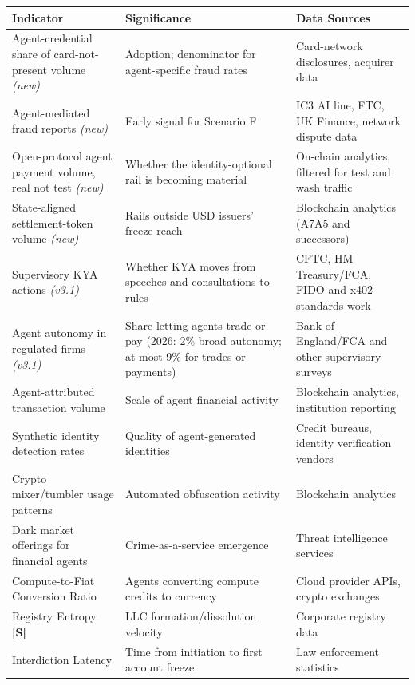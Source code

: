 \documentclass[11pt,letterpaper]{article}
\begin{document}
\begingroup\small
\begin{longtable}{L{0.346\dimexpr{}\tabcolsep\relax}L{0.346\dimexpr{}\tabcolsep\relax}L{0.307\dimexpr{}\tabcolsep\relax}}
\toprule
\textbf{Indicator} & \textbf{Significance} & \textbf{Data Sources} \\
\midrule
\endhead
Agent-credential share of card-not-present volume \textit{(new)} & Adoption; denominator for agent-specific fraud rates & Card-network disclosures, acquirer data \\
Agent-mediated fraud reports \textit{(new)} & Early signal for Scenario F & IC3 AI line, FTC, UK Finance, network dispute data \\
Open-protocol agent payment volume, real not test \textit{(new)} & Whether the identity-optional rail is becoming material & On-chain analytics, filtered for test and wash traffic \\
State-aligned settlement-token volume \textit{(new)} & Rails outside USD issuers' freeze reach & Blockchain analytics (A7A5 and successors) \\
Supervisory KYA actions \textit{(v3.1)} & Whether KYA moves from speeches and consultations to rules & CFTC, HM Treasury/FCA, FIDO and x402 standards work \\
Agent autonomy in regulated firms \textit{(v3.1)} & Share letting agents trade or pay (2026: 2\% broad autonomy; at most 9\% for trades or payments) & Bank of England/FCA and other supervisory surveys \\
Agent-attributed transaction volume & Scale of agent financial activity & Blockchain analytics, institution reporting \\
Synthetic identity detection rates & Quality of agent-generated identities & Credit bureaus, identity verification vendors \\
Crypto mixer/tumbler usage patterns & Automated obfuscation activity & Blockchain analytics \\
Dark market offerings for financial agents & Crime-as-a-service emergence & Threat intelligence services \\
Compute-to-Fiat Conversion Ratio & Agents converting compute credits to currency & Cloud provider APIs, crypto exchanges \\
Registry Entropy \textbf{[S]} & LLC formation/dissolution velocity & Corporate registry data \\
Interdiction Latency & Time from initiation to first account freeze & Law enforcement statistics \\
\bottomrule
\end{longtable}
\endgroup
\end{document}
